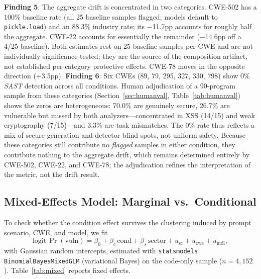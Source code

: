 \documentclass[sigconf,review,anonymous]{acmart}
\begin{document}
\textbf{Finding 5}: The aggregate drift is concentrated in two categories. CWE-502 has a 100\% baseline rate (all 25 baseline samples flagged; models default to \texttt{pickle.load}) and an 88.3\% industry rate; its $-$11.7pp accounts for roughly half the aggregate. CWE-22 accounts for essentially the remainder ($-$14.6pp off a 4/25 baseline). Both estimates rest on 25 baseline samples per CWE and are not individually significance-tested; they are the source of the composition artifact, not established per-category protective effects. CWE-78 moves in the opposite direction ($+$3.5pp). \textbf{Finding 6}: Six CWEs (89, 79, 295, 327, 330, 798) show 0\% \emph{SAST} detection across all conditions. Human adjudication of a 90-program sample from these categories (Section~\ref{sec:humanval}, Table~\ref{tab:humanval}) shows the zeros are heterogeneous: 70.0\% are genuinely secure, 26.7\% are vulnerable but missed by both analyzers---concentrated in XSS (14/15) and weak cryptography (7/15)---and 3.3\% are task mismatches. The 0\% rate thus reflects a mix of secure generation and detector blind spots, not uniform safety. Because these categories still contribute no \emph{flagged} samples in either condition, they contribute nothing to the aggregate drift, which remains determined entirely by CWE-502, CWE-22, and CWE-78; the adjudication refines the interpretation of the metric, not the drift result.

\subsection{Mixed-Effects Model: Marginal vs.\ Conditional}
\label{sec:mixed}

To check whether the condition effect survives the clustering induced by prompt scenario, CWE, and model, we fit
\begin{equation}
\text{logit}\,\Pr(\text{vuln}) = \beta_0 + \beta_c\,\text{cond} + \beta_s\,\text{sector} + u_{\text{sc}} + u_{\text{cwe}} + u_{\text{mdl}},
\end{equation}
with Gaussian random intercepts, estimated with \texttt{statsmodels} \texttt{BinomialBayesMixedGLM} (variational Bayes) on the code-only sample ($n = 4{,}152$). Table~\ref{tab:mixed} reports fixed effects.
\end{document}
